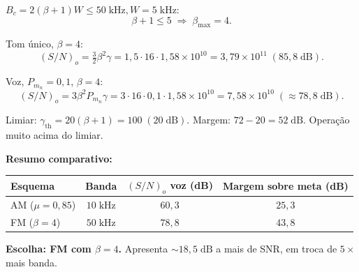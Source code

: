 \documentclass[11pt,a4paper]{article}
\begin{document}
\begin{resolucao}

$B_c = 2(\beta+1)W \le 50\;\text{kHz}, W = 5\;\text{kHz}$:
\[
  \beta + 1 \le 5 \;\Rightarrow\; \boxed{\beta_{\max} = 4.}
\]

Tom único, $\beta = 4$:
\[
  (S/N)_o = \tfrac{3}{2}\beta^2\gamma = 1{,}5\cdot 16\cdot 1{,}58\times 10^{10} = 3{,}79\times 10^{11} \;(85{,}8\;\text{dB}).
\]

Voz, $P_{m_n} = 0{,}1$, $\beta = 4$:
\[
  (S/N)_o = 3\beta^2 P_{m_n}\gamma = 3\cdot 16\cdot 0{,}1\cdot 1{,}58\times 10^{10} = 7{,}58\times 10^{10} \;(\approx 78{,}8\;\text{dB}).
\]

Limiar: $\gamma_{\text{th}} = 20(\beta+1) = 100 \;(20\;\text{dB})$. Margem: $72 - 20 = 52\;\text{dB}$. Operação muito acima do limiar.

\textbf{Resumo comparativo:}
\begin{center}
\begin{tabular}{lccc}
\toprule
Esquema & Banda & $(S/N)_o$ voz (dB) & Margem sobre meta (dB) \\
\midrule
AM ($\mu = 0{,}85$) & $10\;\text{kHz}$ & $60{,}3$ & $25{,}3$ \\
FM ($\beta = 4$)   & $50\;\text{kHz}$ & $78{,}8$ & $43{,}8$ \\
\bottomrule
\end{tabular}
\end{center}

\textbf{Escolha: FM com $\beta = 4$.} Apresenta $\sim 18{,}5\;\text{dB}$ a mais de SNR, em troca de $5\times$ mais banda.
\end{resolucao}
\end{document}
